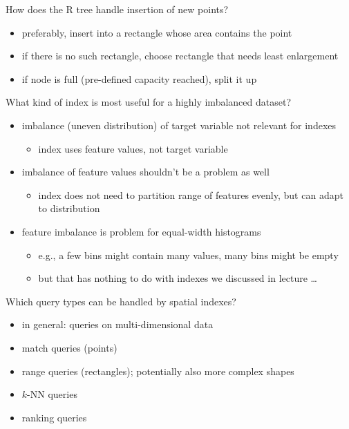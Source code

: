 \documentclass[12pt]{article}
\begin{document}
\begin{question}
	How does the R tree handle insertion of new points?
\end{question}

\begin{itemize}[left=0pt, nosep]
	\item preferably, insert into a rectangle whose area contains the point
	\item if there is no such rectangle, choose rectangle that needs least enlargement
	\item if node is full (pre-defined capacity reached), split it up
\end{itemize}

\begin{question}
	What kind of index is most useful for a highly imbalanced dataset?
\end{question}

\begin{itemize}[left=0pt, nosep]
	\item imbalance (uneven distribution) of target variable not relevant for indexes
	\begin{itemize}[left=0pt, nosep]
		\item index uses feature values, not target variable
	\end{itemize}
	\item imbalance of feature values shouldn't be a problem as well
	\begin{itemize}[left=0pt, nosep]
		\item index does not need to partition range of features evenly, but can adapt to distribution
	\end{itemize}
	\item feature imbalance is problem for equal-width histograms
	\begin{itemize}[left=0pt, nosep]
		\item e.g., a few bins might contain many values, many bins might be empty
		\item but that has nothing to do with indexes we discussed in lecture \dots
	\end{itemize}
\end{itemize}

\begin{question}
	Which query types can be handled by spatial indexes?
\end{question}

\begin{itemize}[left=0pt, nosep]
	\item in general: queries on multi-dimensional data
	\item match queries (points)
	\item range queries (rectangles); potentially also more complex shapes
	\item $k$-NN queries
	\item ranking queries
\end{itemize}
\end{document}

